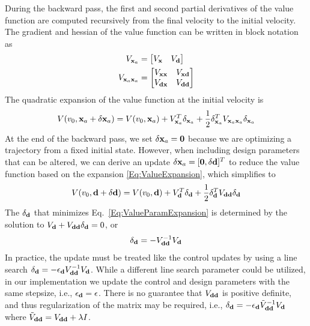 During the backward pass, the first and second partial derivatives of the value function are computed recursively from the final velocity to the initial velocity. The gradient and hessian of the value function can be written in block notation as 
\begin{align}
	V_{\mathbf{x}_a} &= \begin{bmatrix}
		V_{\mathbf{x}} & V_{\mathbf{d}}
	\end{bmatrix} \\
	V_{\mathbf{x}_a\mathbf{x}_a} &= \begin{bmatrix}
		V_{\mathbf{x}\mathbf{x}} & V_{\mathbf{x}\mathbf{d}} \\
		V_{\mathbf{d}\mathbf{x}} & V_{\mathbf{d}\mathbf{d}}
	\end{bmatrix}
\end{align}
The quadratic expansion of the value function at the initial velocity is
\begin{align}
	V(v_0, \mathbf{x}_a+\delta\mathbf{x}_a) = V(v_0, \mathbf{x}_a) + V_{\mathbf{x}_a}^T\delta_{\mathbf{x}_a} + \frac{1}{2}\delta_{\mathbf{x}_a}^TV_{\mathbf{x}_a\mathbf{x}_a}\delta_{\mathbf{x}_a} \label{Eq:ValueExpansion}
\end{align}
At the end of the backward pass, we set $\delta\mathbf{x}_a=\mathbf{0}$ because we are optimizing a trajectory from a fixed initial state. However, when including design parameters that can be altered, we can derive an update $\delta\mathbf{x}_a = [\mathbf{0},\delta\mathbf{d}]^T$ to reduce the value function based on the expansion \eqref{Eq:ValueExpansion}, which simplifies to 
\begin{align}
	V(v_0, \mathbf{d}+\delta\mathbf{d}) = V(v_0, \mathbf{d}) + V_{\mathbf{d}}^T\delta_{\mathbf{d}} + \frac{1}{2}\delta_{\mathbf{d}}^TV_{\mathbf{d}\mathbf{d}}\delta_{\mathbf{d}} \label{Eq:ValueParamExpansion}
\end{align}
The $\delta_{\mathbf{d}}$ that minimizes Eq.~\eqref{Eq:ValueParamExpansion} is determined by the solution to $V_{\mathbf{d}} + V_{\mathbf{d}\mathbf{d}}\delta_{\mathbf{d}} = 0$, or 
\begin{align}
	\delta_{\mathbf{d}} = -V_{\mathbf{d}\mathbf{d}}^{-1}V_{\mathbf{d}}
\end{align}
In practice, the update must be treated like the control updates by using a line search $\delta_{\mathbf{d}} = -\epsilon_{\mathbf{d}} V_{\mathbf{d}\mathbf{d}}^{-1}V_{\mathbf{d}}$. While a different line search parameter could be utilized, in our implementation we update the control and design parameters with the same stepsize, i.e., $\epsilon_{\mathbf{d}}=\epsilon$. There is no guarantee that $V_{\mathbf{d}\mathbf{d}}$ is positive definite, and thus regularization of the matrix may be required, i.e., $\delta_{\mathbf{d}} = -\epsilon_{\mathbf{d}} \tilde{V}_{\mathbf{d}\mathbf{d}}^{-1}V_{\mathbf{d}}$ where $\tilde{V}_{\mathbf{d}\mathbf{d}} = V_{\mathbf{d}\mathbf{d}} + \lambda I$. 

